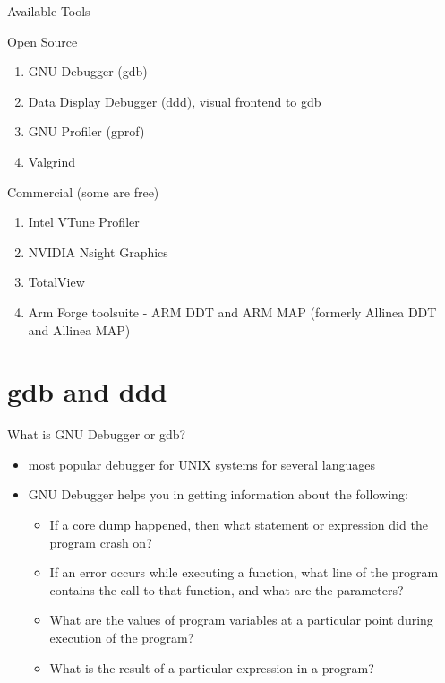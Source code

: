 \documentclass[10pt,t]{beamer}
\begin{document}
\begin{frame}{Available Tools}
  \begin{eblock}{Open Source}
    \begin{enumerate}
    \item GNU Debugger (gdb)
    \item Data Display Debugger (ddd), visual frontend to gdb
    \item GNU Profiler (gprof)
    \item Valgrind
    \end{enumerate}
  \end{eblock}
  
  \begin{eblock}{Commercial (some are free)}
    \begin{enumerate}
    \item Intel VTune Profiler
    \item NVIDIA Nsight Graphics
    \item TotalView
    \item Arm Forge toolsuite - ARM DDT and ARM MAP (formerly Allinea DDT and Allinea MAP)
    \end{enumerate}
  \end{eblock}
\end{frame}

\section{gdb and ddd}
\begin{frame}{What is GNU Debugger or gdb?}
  \begin{itemize}
  \item most popular debugger for UNIX systems for several languages
  \item GNU Debugger helps you in getting information about the following:
    \begin{itemize}
    \item If a core dump happened, then what statement or expression did the program crash on?
    \item If an error occurs while executing a function, what line of the program contains the call to that function, and what are the parameters?
    \item What are the values of program variables at a particular point during execution of the program?
    \item What is the result of a particular expression in a program?
    \end{itemize}
  \end{itemize}
\end{frame}
\end{document}
